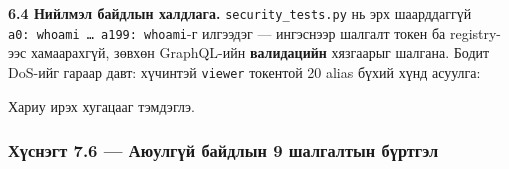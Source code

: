 \textbf{6.4 Нийлмэл байдлын халдлага.} \texttt{security\_\allowbreak{}tests.\allowbreak{}py} нь эрх шаарддаггүй \texttt{a0:\allowbreak{}\ whoami\ \ldots{}\ a199:\allowbreak{}\ whoami}-г илгээдэг --- ингэснээр шалгалт токен ба registry-ээс хамаарахгүй, зөвхөн GraphQL-ийн \textbf{валидацийн} хязгаарыг шалгана. Бодит DoS-ийг гараар давт: хүчинтэй \texttt{viewer} токентой 20 alias бүхий хүнд асуулга:

\begin{Shaded}
\begin{Highlighting}[]
\VariableTok{)}
\KeywordTok{\textbackslash{}}
   \VariableTok{$(}\VariableTok{)} \KeywordTok{\textbackslash{}}
   \VariableTok{$(} \VariableTok{)}
\end{Highlighting}
\end{Shaded}

Хариу ирэх хугацааг тэмдэглэ.

\hypertarget{ux445ux4afux441ux43dux44dux433ux442-7.6-ux430ux44eux443ux43bux433ux4afux439-ux431ux430ux439ux434ux43bux44bux43d-9-ux448ux430ux43bux433ux430ux43bux442ux44bux43d-ux431ux4afux440ux442ux433ux44dux43b}{%
\subsubsection{Хүснэгт 7.6 --- Аюулгүй байдлын 9 шалгалтын бүртгэл}\label{ux445ux4afux441ux43dux44dux433ux442-7.6-ux430ux44eux443ux43bux433ux4afux439-ux431ux430ux439ux434ux43bux44bux43d-9-ux448ux430ux43bux433ux430ux43bux442ux44bux43d-ux431ux4afux440ux442ux433ux44dux43b}}

